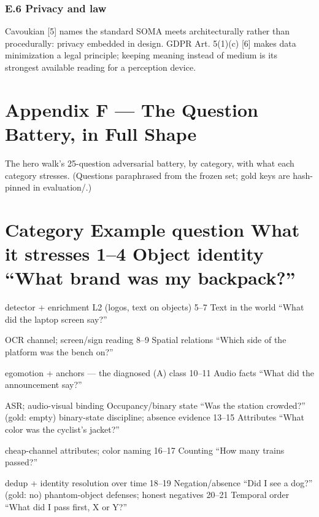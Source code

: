 \subsection{E.6 Privacy and law}\label{e.6-privacy-and-law}

Cavoukian {[}5{]} names the standard SOMA meets architecturally rather than procedurally: privacy embedded in design. GDPR Art. 5(1)(c) {[}6{]} makes data minimization a legal principle; keeping meaning instead of medium is its strongest available reading for a perception device.

\chapter*{Appendix F --- The Question Battery, in Full Shape}\label{appendix-f-the-question-battery-in-full-shape}

The hero walk's 25-question adversarial battery, by category, with what each category stresses. (Questions paraphrased from the frozen set; gold keys are hash-pinned in evaluation/.)

\chapter{Category Example question What it stresses 1--4 Object identity ``What brand was my backpack?''}\label{category-example-question-what-it-stresses-14-object-identity-what-brand-was-my-backpack}

detector + enrichment L2 (logos, text on objects) 5--7 Text in the world ``What did the laptop screen say?''

OCR channel; screen/sign reading 8--9 Spatial relations ``Which side of the platform was the bench on?''

egomotion + anchors --- the diagnosed (A) class 10--11 Audio facts ``What did the announcement say?''

ASR; audio-visual binding Occupancy/binary state ``Was the station crowded?'' (gold: empty) binary-state discipline; absence evidence 13--15 Attributes ``What color was the cyclist's jacket?''

cheap-channel attributes; color naming 16--17 Counting ``How many trains passed?''

dedup + identity resolution over time 18--19 Negation/absence ``Did I see a dog?'' (gold: no) phantom-object defenses; honest negatives 20--21 Temporal order ``What did I pass first, X or Y?''

